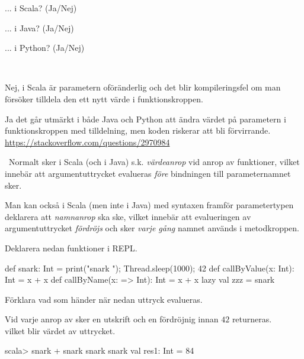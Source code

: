 \Subtask ... i Scala?  (Ja/Nej)

\Subtask ... i Java?  (Ja/Nej)

\Subtask ... i Python?  (Ja/Nej)


\SOLUTION

\TaskSolved \what~

\Subtask Nej, i Scala är parametern oföränderlig och det blir kompileringsfel om man försöker tilldela den ett nytt värde i funktionskroppen.

\Subtask \Subtask Ja det går utmärkt i både Java och Python att ändra värdet på parametern i funktionskroppen med tilldelning, men koden riskerar att bli förvirrande.\\
\url{https://stackoverflow.com/questions/2970984}

\QUESTEND




\QUESTBEGIN

\Task  \what~Normalt sker i Scala (och i Java) s.k. \emph{värdeanrop} vid anrop av funktioner, vilket innebär att argumentuttrycket evalueras \emph{före} bindningen till parameternamnet sker.

Man kan också i Scala (men inte i Java) med syntaxen \code{=>} framför parametertypen deklarera att \emph{namnanrop} ska ske, vilket innebär att evalueringen av argumentuttrycket \emph{fördröjs} och sker \emph{varje gång} namnet används i metodkroppen.

Deklarera nedan funktioner i REPL.

\begin{Code}
def snark: Int = { print("snark "); Thread.sleep(1000); 42 }
def callByValue(x: Int):   Int = x + x
def callByName(x: => Int): Int = x + x
lazy val zzz = snark
\end{Code}

\noindent Förklara vad som händer när nedan uttryck evalueras.

\Subtask {}

\Subtask {}

\Subtask {}

\Subtask {}

\SOLUTION

\TaskSolved \what

\SubtaskSolved Vid varje anrop av  sker en utskrift och en fördröjnig innan $42$ returneras. \\ vilket blir värdet av uttrycket.
\begin{REPL}
scala> snark + snark
snark snark val res1: Int = 84
\end{REPL}

